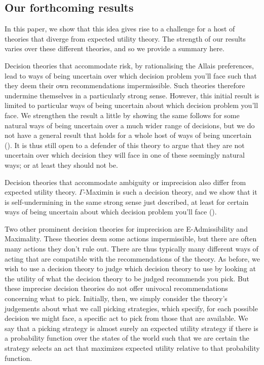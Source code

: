 \documentclass[a4paper]{article}
\newenvironment{CCM rewritten}
{\begingroup\color{blue}} %
{\endgroup}              %
\begin{document}
	\subsection{Our forthcoming results}

	
	
	In this paper, we show that this idea gives rise to a challenge for a host of theories that diverge from expected utility theory. The strength of our results varies over these different theories, and so we provide a summary here.
	
	Decision theories that accommodate risk, by rationalising the Allais preferences, lead to ways of being uncertain over which decision problem you'll face such that they deem their own recommendations impermissible. Such theories therefore undermine themselves in a particularly strong sense. However, this initial result is limited to particular ways of being uncertain about which decision problem you'll face. We strengthen the result a little by showing the same follows for some natural ways of being uncertain over a much wider range of decisions, but we do not have a general result that holds for a whole host of ways of being uncertain (). It is thus still open to a defender of this theory to argue that they are not uncertain over which decision they will face in one of these seemingly natural ways; or at least they should not be. 
	
	Decision theories that accommodate ambiguity or imprecision also differ from expected utility theory. $\Gamma$-Maximin is such a decision theory, and we show that it is self-undermining in the same strong sense just described, at least for certain ways of being uncertain about which decision problem you'll face ().
	
	Two other prominent decision theories for imprecision are E-Admissibility and Maximality. 	
	These theories deem some actions impermissible, but there are often many actions they don't rule out. There are thus typically many different ways of acting that are compatible with the recommendations of the theory. 
	As before, we wish to use a decision theory to judge which decision theory to use by looking at the utility of what the decision theory to be judged recommends you pick. But these imprecise decision theories do not offer univocal recommendations concerning what to pick. Initially, then, we simply consider the theory's judgements about what we call picking strategies, which specify, for each possible decision we might face, a specific act to pick from those that are available. We say that a picking strategy is almost surely an expected utility strategy if there is a probability function over the states of the world such that we are certain the strategy selects an act that maximizes expected utility relative to that probability function.
	 
\end{document}
